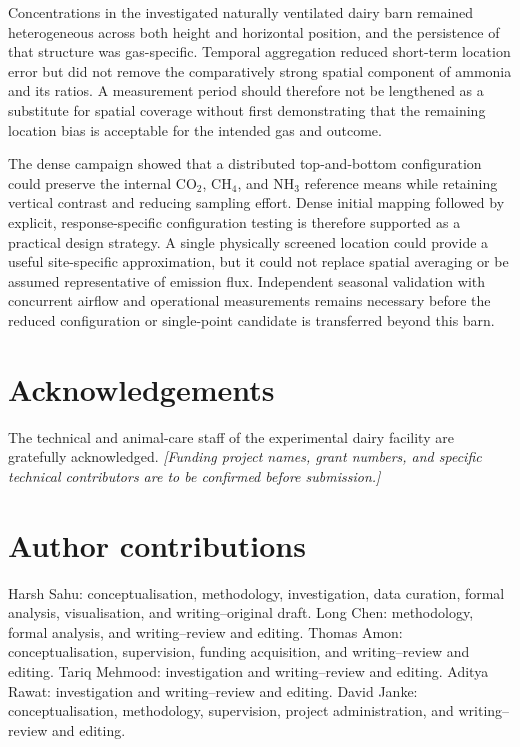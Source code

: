 \documentclass[12pt,a4paper]{article}
\begin{document}
Concentrations in the investigated naturally ventilated dairy barn remained
heterogeneous across both height and horizontal position, and the persistence
of that structure was gas-specific. Temporal aggregation reduced short-term
location error but did not remove the comparatively strong spatial component
of ammonia and its ratios. A measurement period should therefore not be
lengthened as a substitute for spatial coverage without first demonstrating
that the remaining location bias is acceptable for the intended gas and
outcome.

The dense campaign showed that a distributed top-and-bottom configuration
could preserve the internal \(\mathrm{CO_2}\), \(\mathrm{CH_4}\), and
\(\mathrm{NH_3}\) reference means while retaining vertical contrast and
reducing sampling effort. Dense initial mapping followed by explicit,
response-specific configuration testing is therefore supported as a practical
design strategy. A single physically screened location could provide a useful
site-specific approximation, but it could not replace spatial averaging or be
assumed representative of emission flux. Independent seasonal validation with
concurrent airflow and operational measurements remains necessary before the
reduced configuration or single-point candidate is transferred beyond this
barn.

\section*{Acknowledgements}

The technical and animal-care staff of the experimental dairy facility are
gratefully acknowledged. \textit{[Funding project names, grant numbers, and
specific technical contributors are to be confirmed before submission.]}

\section*{Author contributions}

Harsh Sahu: conceptualisation, methodology, investigation, data curation,
formal analysis, visualisation, and writing--original draft. Long Chen:
methodology, formal analysis, and writing--review and editing. Thomas Amon:
conceptualisation, supervision, funding acquisition, and writing--review and
editing. Tariq Mehmood: investigation and writing--review and editing. Aditya
Rawat: investigation and writing--review and editing. David Janke:
conceptualisation, methodology, supervision, project administration, and
writing--review and editing.
\end{document}
